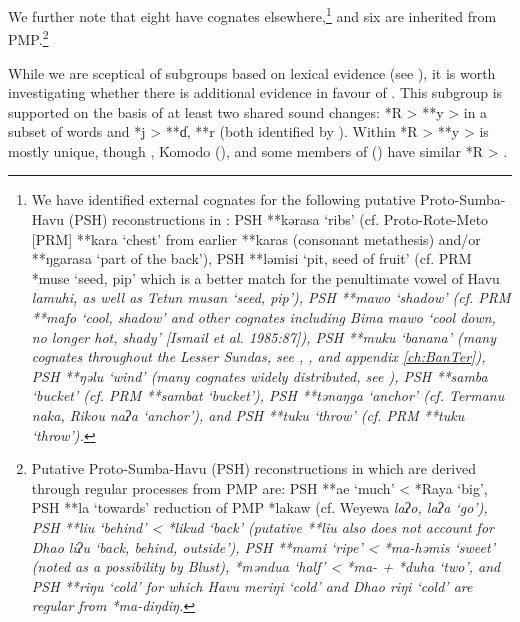 We further note that eight have cognates elsewhere,\footnote{
		We have identified external cognates %
		for the following
		putative Proto-Sumba-Havu (PSH) reconstructions in \citet[109--111]{Blust2008}:
		PSH **kərasa ‘ribs’ (cf.
		Proto-Rote-Meto [PRM] **kara ‘chest’ from earlier **karas (consonant
		metathesis) and/or **ŋgarasa ‘part of the back’),
		PSH **ləmisi ‘pit, seed of fruit’ (cf.
		PRM *muse ‘seed, pip’ which is a better match for the penultimate
		vowel of Havu \it{lamuhi},
		as well as Tetun \it{musan} ‘seed,
		pip’), PSH **mawo ‘shadow’ (cf.
		PRM **mafo ‘cool, shadow’ and other cognates including
		Bima \it{mawo} ‘cool down,
		no longer hot, shady’ [Ismail et al.
		1985:87]), PSH **muku ‘banana’ (many cognates throughout the
		Lesser Sundas, see , , and appendix
		\ref{ch:BanTer}), PSH **ŋəlu ‘wind’ (many cognates widely distributed,
		see ), PSH **samba ‘bucket’ (cf.
		PRM **sambat ‘bucket’), PSH **tənaŋga ‘anchor’ (cf.
		Termanu \it{naka}, Rikou \it{naʔa} ‘anchor’), and PSH **tuku ‘throw’ (cf.
		PRM **tuku ‘throw’).} 
and six are inherited from PMP.\footnote{
		Putative Proto-Sumba-Havu
		(PSH) reconstructions in \citet[109--111]{Blust2008} which are
		derived through regular processes from PMP are: PSH **ae ‘much’
		< *Raya ‘big’, PSH **la ‘towards’ reduction of PMP *lakaw (cf.
		Weyewa \it{laʔo}, \it{laʔa} ‘go’),
		PSH **liu ‘behind’ < *likud ‘back’ (putative **liu also does
		not account for Dhao \it{liʔu} ‘back,
		behind, outside’), PSH **mami ‘ripe’ < *ma-həmis ‘sweet’ (noted
		as a possibility by Blust),
		*məndua ‘half’ < *ma- + *duha ‘two’,
		and PSH **riŋu ‘cold’ for which Havu \it{meriŋi} ‘cold’
		and Dhao \it{riŋi} ‘cold’ are regular from *ma-diŋdiŋ.}

\largerpage
While we are sceptical of subgroups based on lexical evidence
(see ),
it is worth investigating whether there is
additional evidence in favour of .
This subgroup is supported on the basis of at least
two shared sound changes: *R > **y > {\0} in a subset of words
and *j > **ɗ, **r (both identified by \citealp[93--94]{Blust2008}).
Within 
*R > **y > {\0} is mostly unique,
though , Komodo (),
and some members of  () have similar *R > {\0}.

